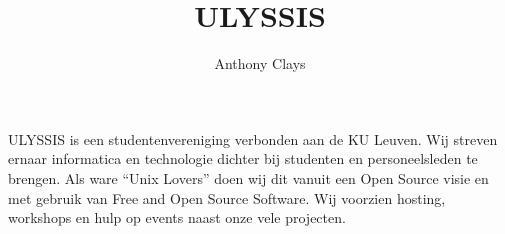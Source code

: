 \documentclass[11pt]{article}
\title{ULYSSIS}
\author{Anthony Clays}
\begin{document}
\maketitle

ULYSSIS is een studentenvereniging verbonden aan de KU Leuven.
Wij streven ernaar informatica en technologie dichter bij studenten en personeelsleden te brengen.
Als ware ``Unix Lovers'' doen wij dit vanuit een Open Source visie en met gebruik van Free and Open Source Software.
Wij voorzien hosting, workshops en hulp op events naast onze vele projecten.
\end{document}
